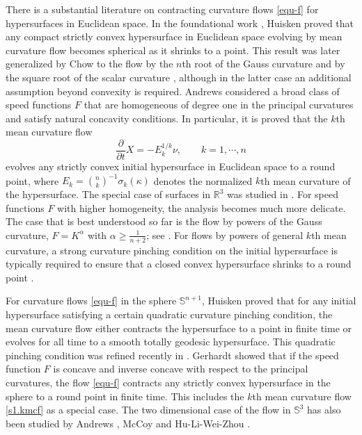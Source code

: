 \documentclass[11pt,reqno]{amsart}
\theoremstyle{remark}
\numberwithin{equation}{section}
\begin{document}
There is a substantial literature on contracting curvature flows \eqref{equ-f} for hypersurfaces in Euclidean space. In the foundational work \cite{Hui86}, Huisken proved that any compact strictly convex hypersurface in Euclidean space evolving by mean curvature flow becomes spherical as it shrinks to a point. This result was later generalized by Chow to the flow by the $n$th root of the Gauss curvature \cite{chow85} and by the square root of the scalar curvature \cite{chow87}, although in the latter case an additional assumption beyond convexity is required. Andrews \cite{And94,And07} considered a broad class of speed functions $F$ that are homogeneous of degree one in the principal curvatures and satisfy natural concavity conditions. In particular, it is proved that the $k$th mean curvature flow
\begin{equation}\label{s1.kmcf}
\frac{\partial }{\partial t}X=-E_k^{1/k}\nu,\qquad k=1,\cdots,n    
\end{equation}
evolves any strictly convex initial hypersurface in Euclidean space to a round point, where $E_k=\binom{n}{k}^{-1}\sigma_k(\kappa)$ denotes the normalized $k$th mean curvature of the hypersurface. The special case of surfaces in $\mathbb{R}^3$ was studied in \cite{And10,schn05}. For speed functions $F$ with higher homogeneity, the analysis becomes much more delicate. The case that is best understood so far is the flow by powers of the Gauss curvature, $F=K^{\alpha}$ with $\alpha\geq \frac{1}{n+2}$; see \cite{And96,And99,And00,AGN16,BCD17,CD16,GN17,Tso85}. For flows by powers of general $k$th mean curvature, a strong curvature pinching condition on the initial hypersurface is typically required to ensure that a closed convex hypersurface shrinks to a round point \cite{AS10,AM12,Sch05,Sch06}.

For curvature flows \eqref{equ-f} in the sphere $\mathbb{S}^{n+1}$, Huisken \cite{Hui87} proved that for any initial hypersurface satisfying a certain quadratic curvature pinching condition, the mean curvature flow either contracts the hypersurface to a point in finite time or evolves for all time to a smooth totally geodesic hypersurface. This quadratic pinching condition was refined recently in \cite{lan25}.  Gerhardt \cite{Ger15} showed that if the speed function $F$ is concave and inverse concave with respect to the principal curvatures, the flow \eqref{equ-f} contracts any strictly convex hypersurface in the sphere to a round point in finite time. This includes the $k$th mean curvature flow \eqref{s1.kmcf} as a special case. The two dimensional case of the flow in $\mathbb{S}^3$ has also been studied by Andrews \cite{And02},  McCoy \cite{McC18} and Hu-Li-Wei-Zhou \cite{HLWZ20}.
\end{document}

